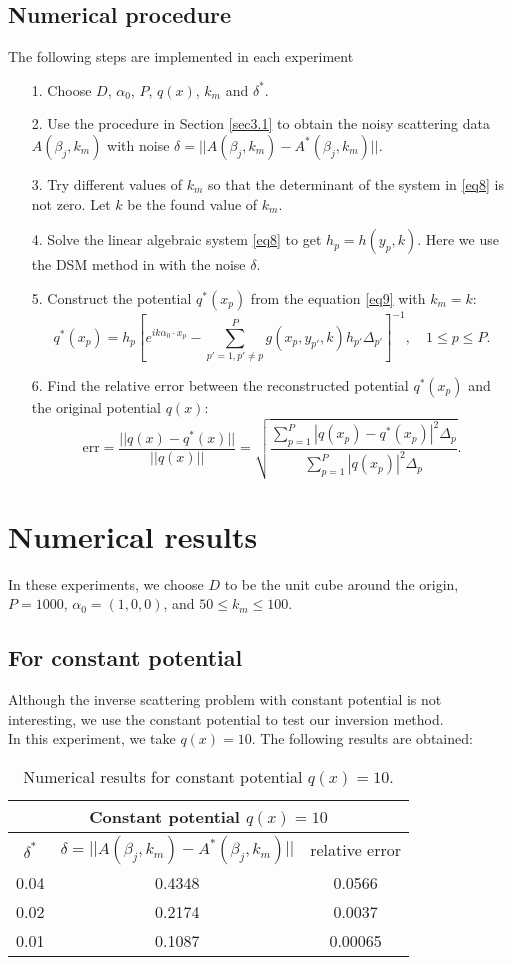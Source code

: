 \documentclass[12pt]{article}
\theoremstyle{plain}
\def\be{\begin{equation}}
\def\ee{\end{equation}}
\begin{document}
\subsection{Numerical procedure}\label{sec3.2}
The following steps are implemented in each experiment
\begin{itemize}
\item[1.] Choose $D$, $\alpha_0$, $P$, $q(x)$, $k_m$ and $\delta^*$.
\item[2.] Use the procedure in Section \ref{sec3.1} to obtain the noisy scattering data $A(\beta_j, k_m)$ with noise $\delta = ||A(\beta_j,k_m) - A^*(\beta_j,k_m)||$.
\item[3.] Try different values of $k_m$ so that the determinant of the system in \eqref{eq8} is not zero. Let $k$ be the found value of $k_m$.
\item[4.] Solve the linear algebraic system \eqref{eq8} to get $h_p = h(y_p, k)$. Here we use the DSM method in \cite{R526} with the noise $\delta$.
\item[5.] Construct the potential $q^*(x_p)$ from the equation \eqref{eq9} with $k_m = k$:
$$q^*(x_p) = h_{p}\left[ e^{ik\alpha_0\cdot x_p} - \sum_{p' = 1, p' \neq p}^P g(x_p, y_{p'}, k)h_{p'}\Delta_{p'} \right]^{-1}, \quad 1 \leq p \leq P.$$
\item[6.] Find the relative error between the reconstructed potential $q^*(x_p)$ and the original potential $q(x)$:
\be\label{eq12}
\text{err} = \frac{||q(x) - q^*(x)||}{||q(x)||} = \sqrt{\frac{\sum_{p = 1}^P|q(x_p) - q^*(x_p)|^2\Delta_p}{\sum_{p = 1}^P|q(x_p)|^2\Delta_p}}.
\ee
\end{itemize}

\section{Numerical results}\label{sec4}
In these experiments, we choose $D$ to be the unit cube around the origin, $P = 1000$, $\alpha_0 = (1,0,0)$, and $50 \leq k_m \leq 100$.
\subsection{For constant potential}\label{sec4.1}
Although the inverse scattering problem with constant potential is not interesting, we use the constant potential to test our inversion method.\\
In this experiment, we take $q(x) = 10$. The following results are obtained:
\begin{table}[H]
\begin{center}\begin{tabular}{ccc}
\hline
\multicolumn{3}{c}{Constant potential $q(x) = 10$}\\
\hline
$\delta^*$ & $\delta  = ||A(\beta_j,k_m) - A^*(\beta_j,k_m)||$ & relative error\\
\hline
0.04 & 0.4348 & 0.0566\\
0.02 & 0.2174 & 0.0037\\
0.01 & 0.1087 & 0.00065\\
\hline
\end{tabular} \caption{Numerical results for constant potential $q(x) = 10$.}\label{tab1}
\end{center}
\end{table}
\end{document}
